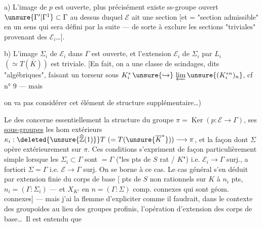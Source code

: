 a) L'image \inserted{\(\Sigma\)} de \(p\) est ouverte, plus précisément existe
ss-groupe ouvert \(\unsure{\Gamma'|\Gamma^1}\subset\Gamma\) au dessus duquel
\(\mathcal E\) ait une section [et = "section admissible" en un sens qui sera
défini par la suite --- de sorte à exclure les sections "triviales" provenant
des \(\mathcal E_i\)\ldots].

b) L'image \(\Sigma_i\) de \(\mathcal E_i\) dans \(\Gamma\) est ouverte, et
l'extension \(\mathcal E_i\) de \(\Sigma_i\) par \(L_i\)
\((\simeq T(\overline K))\) est triviale. [En fait, on a une classe
 de scindages, dits "algébriques", faisant un
torseur sous
\(K_i^*\,\unsure{\hookrightarrow}\,\varprojlim\unsure{(K_i^{*n})_n}\),
cf n° 9  --- mais



on va pas considérer  cet élément de structure
supplémentaire\ldots)


Le  des  concerne
essentiellement la structure du groupe \(\pi=\operatorname{Ker}(p:\mathcal E\to\Gamma)\),
ses  \uline{sous-groupes}
 les hom extérieurs
\(\kappa_i:\deleted{\unsure{\widehat{\mathbb Z}(1)}}T\ (=T(\unsure{\overline K^*}))\longrightarrow\pi\),
et la façon dont \(\Sigma\) opère extérieurement sur \(\pi\).
Ces conditions s'expriment de façon particulièrement simple lorsque les
\(\Sigma_i\subset\Gamma\) sont \(=\Gamma\)
("les pts de \(S\)  rat / \(K\)") i.e.
\(\mathcal E_i\to\Gamma\) surj., a fortiori \(\Sigma=\Gamma\) i.e.
\(\mathcal E\to\Gamma\) surj. On se borne à ce cas. Le cas général s'en déduit
par extension finie du corps de base
[  pts de
\(S\) non rationnels sur \(K\)
à \(n_i\) pts, 
\(n_i=(\Gamma:\Sigma_i)\) \unsure{\(\}\)} --- et \(X_{K'}\)
  en \(n=(\Gamma:\Sigma)\) comp. connexes
qui sont géom. connexes] --- mais j'ai la flemme d'expliciter comme il faudrait,
dans le contexte des groupoïdes au  lieu des groupes
profinis, l'opération d'extension des corps de base\ldots\ Il est entendu que


